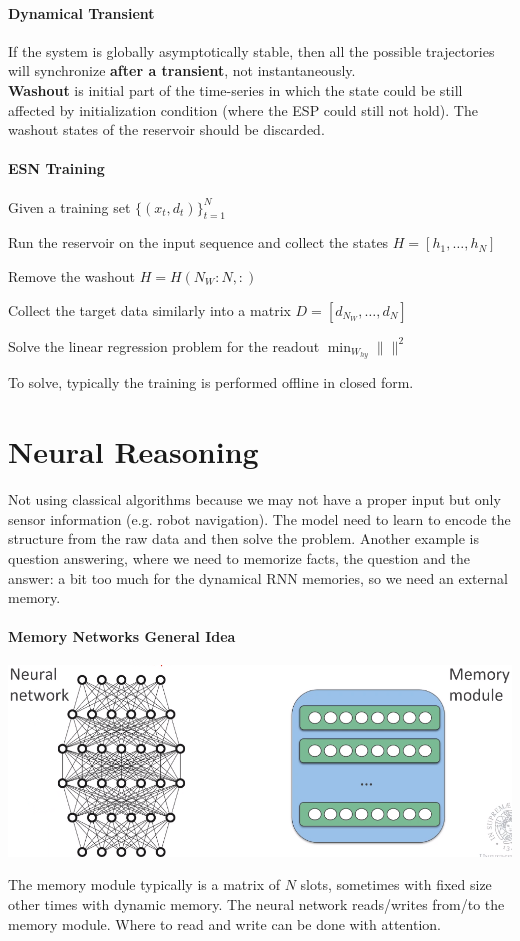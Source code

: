 \documentclass[10pt]{report}
\begin{document}
\paragraph{Dynamical Transient} If the system is globally asymptotically stable, then all the possible trajectories will synchronize \textbf{after a transient}, not instantaneously.\\
\textbf{Washout} is initial part of the time-series in which the state could be still affected by initialization condition (where the ESP could still not hold). The washout states of the reservoir should be discarded.
\paragraph{ESN Training}
\begin{list}{}{}
	\item Given a training set $\{(x_t,d_t)\}_{t=1}^N$
	\item Run the reservoir on the input sequence and collect the states $H=[h_1,\ldots,h_N]$
	\item Remove the washout $H = H(N_W:N,:)$
	\item Collect the target data similarly into a matrix $D = [d_{N_W},\ldots,d_N]$
	\item Solve the linear regression problem for the readout $\min_{W_{hy}}\| \|^2$ %
\end{list}
To solve, typically the training is performed offline in closed form.
\section{Neural Reasoning}
Not using classical algorithms because we may not have a proper input but only sensor information (e.g. robot navigation). The model need to learn to encode the structure from the raw data and then solve the problem. Another example is question answering, where we need to memorize facts, the question and the answer: a bit too much for the dynamical RNN memories, so we need an external memory.
\paragraph{Memory Networks General Idea} \begin{center}
	\includegraphics[scale=0.5]{127.png}
\end{center}
The memory module typically is a matrix of $N$ slots, sometimes with fixed size other times with dynamic memory. The neural network reads/writes from/to the memory module. Where to read and write can be done with attention.
\end{document}
